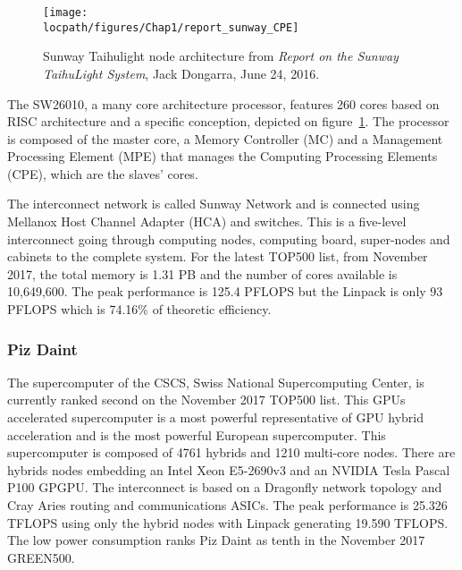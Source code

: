 \begin{figure}[t!]
\centering
\texttt{[image: \\locpath/figures/Chap1/report\_sunway\_CPE]}
\caption[Sunway Tahulight node architecture]{Sunway Taihulight node architecture from \textit{Report on the Sunway TaihuLight System}, Jack Dongarra, June 24, 2016.}
\label{fig:chap1_report_sunway_CPE}
\end{figure}

The SW26010, a many core architecture processor, features 260 cores based on RISC architecture and a specific conception, depicted on figure~\ref{fig:chap1_report_sunway_CPE}. 
The processor is composed of the master core, a Memory Controller (MC) and a Management Processing Element (MPE) that manages the Computing Processing Elements (CPE), which are the slaves’ cores. 

The interconnect network is called Sunway Network and is connected using Mellanox Host Channel Adapter (HCA) and switches. 
This is a five-level interconnect going through computing nodes, computing board, super-nodes and cabinets to the complete system.
For the latest TOP500 list, from November 2017, the total memory is 1.31 PB and the number of cores available is 10,649,600.
The peak performance is 125.4 PFLOPS but the Linpack is only 93 PFLOPS which is 74.16\% of theoretic efficiency. 

\subsubsection{Piz Daint}
The supercomputer of the CSCS, Swiss National Supercomputing Center, is currently ranked second on the November 2017 TOP500 list. 
This GPUs accelerated supercomputer is a most powerful representative of GPU hybrid acceleration and is the most powerful European supercomputer. 
This supercomputer is composed of 4761 hybrids and 1210 multi-core nodes. 
There are hybrids nodes embedding an Intel Xeon E5-2690v3 and an NVIDIA Tesla Pascal P100 GPGPU. 
The interconnect is based on a Dragonfly network topology and Cray Aries routing and communications ASICs. 
The peak performance is 25.326 TFLOPS using only the hybrid nodes with Linpack generating 19.590 TFLOPS.
The low power consumption ranks Piz Daint as tenth in the November 2017 GREEN500.

